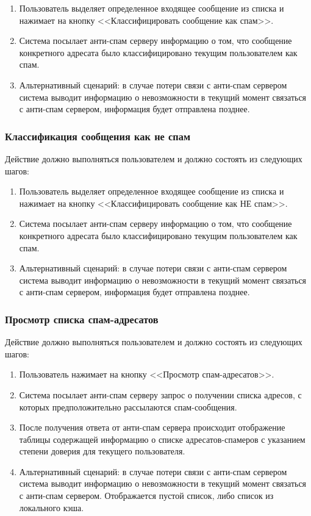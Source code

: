 \begin{enumerate}
  \item Пользователь выделяет определенное входящее сообщение из списка и нажимает на кнопку <<Классифицировать сообщение как спам>>.
  \item Система посылает анти-спам серверу информацию о том, что сообщение конкретного адресата было классифицировано текущим пользователем как спам.
  \item Альтернативный сценарий: в случае потери связи с анти-спам сервером система выводит информацию о невозможности в текущий момент связаться с анти-спам сервером, информация будет отправлена позднее.
\end{enumerate}

\subsubsection{Классификация сообщения как не спам}
Действие должно выполняться пользователем и должно состоять из следующих шагов:

\begin{enumerate}
  \item Пользователь выделяет определенное входящее сообщение из списка и нажимает на кнопку <<Классифицировать сообщение как НЕ спам>>.
  \item Система посылает анти-спам серверу информацию о том, что сообщение конкретного адресата было классифицировано текущим пользователем как спам.
  \item Альтернативный сценарий: в случае потери связи с анти-спам сервером система выводит информацию о невозможности в текущий момент связаться с анти-спам сервером, информация будет отправлена позднее.
\end{enumerate}

\subsubsection{Просмотр списка спам-адресатов}
Действие должно выполняться пользователем и должно состоять из следующих шагов:

\begin{enumerate}
  \item Пользователь нажимает на кнопку <<Просмотр спам-адресатов>>.
  \item Система посылает анти-спам серверу запрос о получении списка адресов, с которых предположительно рассылаются спам-сообщения.
  \item После получения ответа от анти-спам сервера происходит отображение таблицы содержащей информацию о списке адресатов-спамеров с указанием степени  доверия для текущего пользователя.
  \item Альтернативный сценарий: в случае потери связи с анти-спам сервером система выводит информацию о невозможности в текущий момент связаться с анти-спам сервером. Отображается пустой список, либо список из локального кэша.
\end{enumerate}

